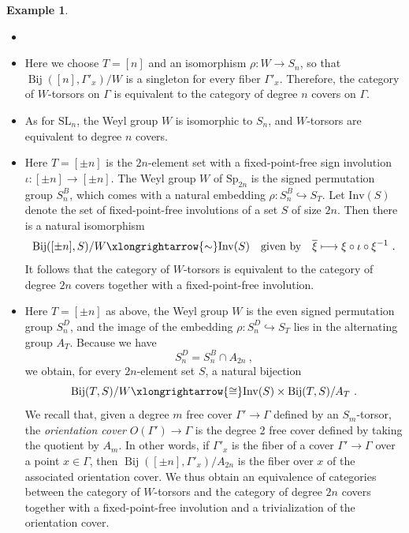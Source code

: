 \documentclass[10pt, a4paper]{amsart}
\theoremstyle{definition}
\newtheorem{example}[theorem]{Example}
\theoremstyle{myitemstyle}
\DeclareMathOperator{\PGL}{PGL}
\newcommand{\SL}{{\mathrm{SL}}}
\newcommand{\Sp}{{\mathrm{Sp}}}
\newcommand{\SO}{{\mathrm{SO}}}
\newcommand{\Ga}{\Gamma}
\DeclareMathOperator{\Bij}{Bij}
\begin{document}
\begin{example}
\label{exa:phocovers}
    \begin{itemize}
        \item []
        
        \item [$\SL_n$:] Here we choose $T=[n]$ and an isomorphism $\rho\colon W\to S_n$, so that $\Bij([n],\Ga'_x)/W$ is a singleton for every fiber $\Ga'_x$. Therefore, the category of $W$-torsors on $\Gamma$ is equivalent to the category of degree $n$ covers on $\Gamma$.
        
        \item[$\PGL_n$:] As for $\SL_n$, the Weyl group $W$ is isomorphic to $S_n$, and $W$-torsors are equivalent to degree $n$ covers.
        
        \item [$\Sp_{2n}:$] Here $T=[\pm n]$ is the $2n$-element set with a fixed-point-free sign involution $\iota:[\pm n]\to [\pm n]$. The Weyl group $W$ of $\Sp_{2n}$ is the signed permutation group $S_n^B$, which comes with a natural embedding $\rho:S_n^B\hookrightarrow S_T$. Let $\mathrm{Inv}(S)$ denote the set of fixed-point-free involutions of a set $S$ of size $2n$. Then there is a natural isomorphism 
        \[
        \Bij([\pm n], S)/W \xlongrightarrow{\sim} \mathrm{Inv}(S) \quad \text{given by} \quad \overline\xi \longmapsto \xi\circ \iota\circ\xi^{-1} \ .
        \]
        It follows that the category of $W$-torsors is equivalent to the category of degree $2n$ covers together with a fixed-point-free involution. 
        
        \item [$\SO_
        {2n}$:] Here $T=[\pm n]$ as above, the Weyl group $W$ is the even signed permutation group $S_n^D$, and the image of the embedding $\rho:S^D_n\hookrightarrow S_T$ lies in the alternating group $A_T$. Because we have
        \[
        S^D_{n}=S^B_{n}\cap A_{2n} \ ,
        \]
        we obtain, for every $2n$-element set $S$, a natural bijection
        \[
        \Bij(T,S)/W \xlongrightarrow{\cong} \mathrm{Inv}(S)\times \Bij(T,S)/A_T \ .
        \]
        We recall that, given a degree $m$ free cover $\Ga'\to \Ga$ defined by an $S_m$-torsor, the \emph{orientation cover} $O(\Ga')\to \Ga$ is the degree 2 free cover defined by taking the quotient by $A_m$. In other words, if $\Gamma'_x$ is the fiber of a cover $\Gamma'\to \Gamma$ over a point $x\in \Gamma$, then $\Bij([\pm n],\Gamma'_x)/A_{2n}$ is the fiber over $x$ of the associated orientation cover. We thus obtain an equivalence of categories between the category of $W$-torsors and the category of degree $2n$ covers together with a fixed-point-free involution and a trivialization of the orientation cover.


\end{itemize}
\end{example}
\end{document}

